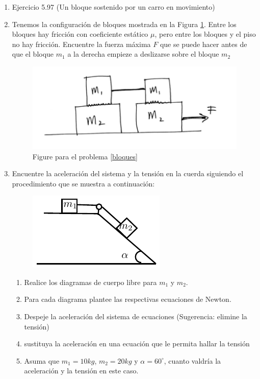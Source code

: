 \documentclass[letterpaper,10pt,onecolumn]{article}
\begin{document}
\begin{enumerate}
\item Ejercicio 5.97 (Un bloque sostenido por un carro en movimiento) %

\item\label{bloques} %
Tenemos la configuraci\'on de bloques mostrada en la Figura \ref{fig:bloques}. 
Entre los bloques hay fricci\'on con coeficiente est\'atico $\mu$, pero entre los bloques y el piso no hay fricci\'on. Encuentre la fuerza m\'axima $F$ que se puede hacer antes de que el bloque $m_1$ a la derecha empieze a deslizarse sobre el bloque $m_2$

\begin{figure}[h]
\begin{center} 
\includegraphics[scale=0.25]{bloques.png} 
\caption{\label{fig:bloques}Figure para el problema \ref{bloques}}
\end{center} 
\end{figure}


\item
Encuentre la aceleración del sistema y la tensión en la cuerda siguiendo el procedimiento que se muestra a continuación:
\begin{figure}[h]
\begin{center} 
\includegraphics{complementaria11.pdf} 
\end{center} 
\end{figure}

\begin{enumerate}
\item
Realice los diagramas de cuerpo libre para $m_1$ y $m_2$.
\item
Para cada diagrama plantee las respectivas ecuaciones de Newton.
\item
Despeje la aceleración del sistema de ecuaciones (Sugerencia: elimine la tensión)
\item
sustituya la aceleración en una ecuación que le permita hallar la tensión
\item
Asuma que $m_1=10kg$,  $m_2=20kg$ y $\alpha=60^{\circ}$, cuanto valdría la aceleración y la tensión en este caso. 
 \end{enumerate}
 

\end{enumerate}
\end{document}
